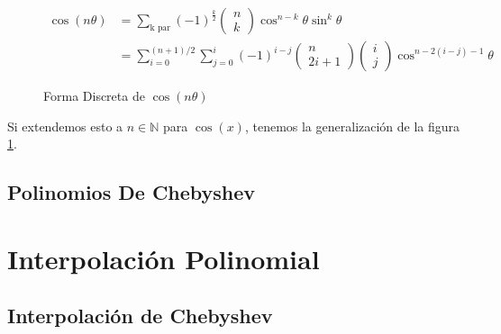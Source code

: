 \documentclass[12pt,letterpaper]{article}
\begin{document}
			\begin{figure}
				\begin{center}
					\begin{equation}
						\begin{split}
							\cos \left(n\theta\right) &= \sum_{\text{k par}} \left(-1\right)^{\frac{k}{2}}
							\begin{pmatrix}
								n\\
								k
							\end{pmatrix} \cos^{n-k}\theta\sin^{k}\theta\\
							&= \sum_{i=0}^{\left(n + 1\right) \slash 2} \sum_{j=0}^{i} \left(-1\right)^{i-j}
							\begin{pmatrix}
								n\\
								2i + 1
							\end{pmatrix}
							\begin{pmatrix}
								i\\
								j
							\end{pmatrix} \cos^{n-2\left(i-j\right)-1}\theta
						\end{split}
					\end{equation}
				\end{center}
				\label{gen1:cos1}
				\caption{Forma Discreta de ${\cos\left(n \theta\right)}$}
			\end{figure}

			Si extendemos esto a ${n\in\mathbb{N}}$ para ${\cos\left(x\right)}$,
			tenemos la generalización de la figura \ref{gen1:cos1}\cite{TRIGID:1}.

		\section{Polinomios De Chebyshev} %

	\chapter{Interpolación Polinomial} \label{C2}
		\section{Interpolación de Chebyshev} \label{C2S1}

	\medskip

	\printbibliography[title={Referencias}]
	\printbibliography[keyword={YT},heading=subbibintoc,title={Videos de YouTube}]
	\printbibliography[keyword={Web},heading=subbibintoc,title={Páginas Web Y Artículos}]
\end{document}
